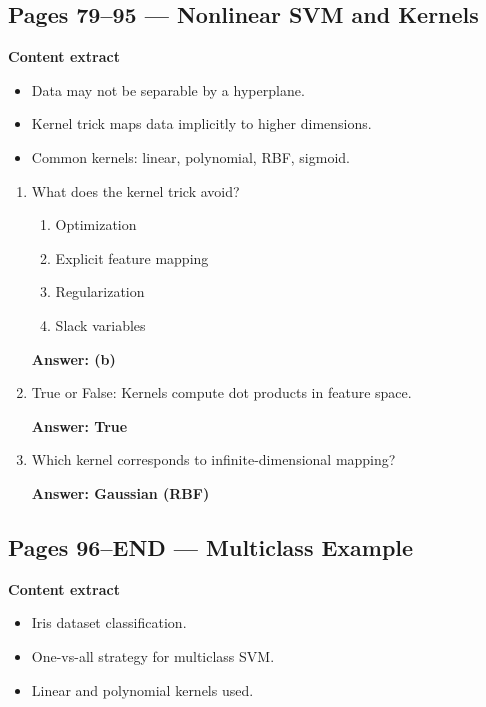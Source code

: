 \documentclass[12pt]{article}
\begin{document}
\subsection*{Pages 79--95 — Nonlinear SVM and Kernels}

\textbf{Content extract}
\begin{itemize}
	\item Data may not be separable by a hyperplane.
	\item Kernel trick maps data implicitly to higher dimensions.
	\item Common kernels: linear, polynomial, RBF, sigmoid.
\end{itemize}

\begin{enumerate}
	\item What does the kernel trick avoid?
	\begin{enumerate}
		\item Optimization
		\item Explicit feature mapping
		\item Regularization
		\item Slack variables
	\end{enumerate}
	\textbf{Answer: (b)}
	
	\item True or False: Kernels compute dot products in feature space.
	
	\textbf{Answer: True}
	
	\item Which kernel corresponds to infinite-dimensional mapping?
	
	\textbf{Answer: Gaussian (RBF)}
\end{enumerate}


\subsection*{Pages 96--END — Multiclass Example}

\textbf{Content extract}
\begin{itemize}
	\item Iris dataset classification.
	\item One-vs-all strategy for multiclass SVM.
	\item Linear and polynomial kernels used.
\end{itemize}
\end{document}
